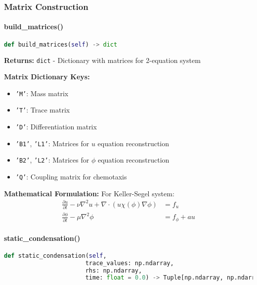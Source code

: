 \subsubsection{Matrix Construction}

\paragraph{build\_matrices()}\leavevmode
\begin{lstlisting}[language=Python, caption=KellerSegel Build Matrices]
def build_matrices(self) -> dict
\end{lstlisting}

\textbf{Returns:} \texttt{dict} - Dictionary with matrices for 2-equation system

\textbf{Matrix Dictionary Keys:}
\begin{itemize}
    \item \texttt{'M'}: Mass matrix
    \item \texttt{'T'}: Trace matrix  
    \item \texttt{'D'}: Differentiation matrix
    \item \texttt{'B1'}, \texttt{'L1'}: Matrices for $u$ equation reconstruction
    \item \texttt{'B2'}, \texttt{'L2'}: Matrices for $\phi$ equation reconstruction
    \item \texttt{'Q'}: Coupling matrix for chemotaxis
\end{itemize}

\textbf{Mathematical Formulation:}
For Keller-Segel system:
\begin{align}
\frac{\partial u}{\partial t} - \nu \nabla^2 u + \nabla \cdot (u \chi(\phi) \nabla \phi) &= f_u \\
\frac{\partial \phi}{\partial t} - \mu \nabla^2 \phi &= f_\phi + a u
\end{align}

\paragraph{static\_condensation()}\leavevmode
\begin{lstlisting}[language=Python, caption=KellerSegel Static Condensation]
def static_condensation(self, 
                       trace_values: np.ndarray, 
                       rhs: np.ndarray, 
                       time: float = 0.0) -> Tuple[np.ndarray, np.ndarray, np.ndarray]
\end{lstlisting}

